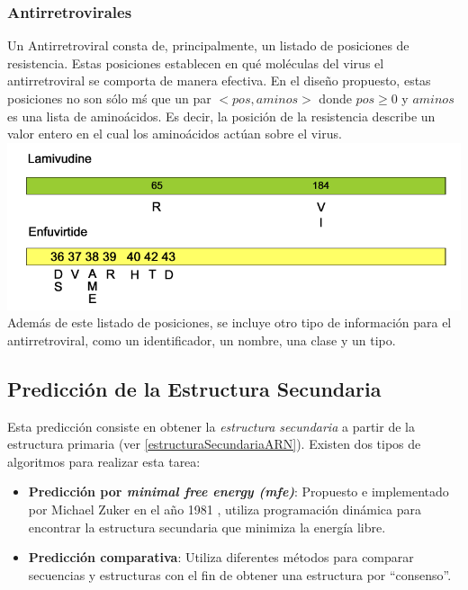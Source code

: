 \subsubsection{Antirretrovirales}
Un Antirretroviral consta de, principalmente, un listado de posiciones de resistencia. Estas posiciones establecen en qu\'e mol\'eculas del virus
el antirretroviral se comporta de manera efectiva. En el dise\~no propuesto, estas posiciones no son s\'olo m\'s que un par $<pos , aminos>$ donde 
$pos \geq 0$ y $aminos$ es una lista de amino\'acidos. Es decir, la posici\'on de la resistencia describe un valor entero en el cual los amino\'acidos
act\'uan sobre el virus.
  \includegraphics[scale=1]{images/Antivirals.png}\\

Adem\'as de este listado de posiciones, se incluye otro tipo de informaci\'on para el antirretroviral, como un identificador, un nombre, una clase y
un tipo.

\subsection{Predicci\'on de la Estructura Secundaria}
Esta predicci\'on consiste en obtener la \emph{estructura secundaria} a partir de la estructura primaria (ver \ref{estructuraSecundariaARN}). Existen
dos tipos de algoritmos para realizar esta tarea:
\begin{itemize}
 \item \textbf{Predicci\'on por \emph{minimal free energy (mfe)}}: Propuesto e implementado por Michael Zuker en el a\~no 1981 \cite{Zuker84}, utiliza programaci\'on
   din\'amica para encontrar la estructura secundaria que minimiza la energ\'ia libre.
 \item \textbf{Predicci\'on comparativa}: Utiliza diferentes m\'etodos para comparar secuencias y estructuras con el fin de obtener una estructura por ``consenso''\cite{Gardner04}.
\end{itemize}

